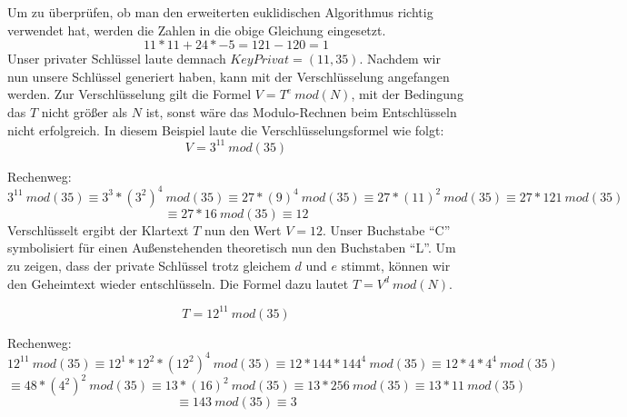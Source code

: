 Um zu überprüfen, ob man den erweiterten euklidischen Algorithmus richtig
verwendet hat, werden die Zahlen in die obige Gleichung eingesetzt.
\begin{displaymath}
11*11 + 24 * -5 = 121 - 120 = 1
\end{displaymath}
Unser privater Schlüssel laute demnach $KeyPrivat = (11,35)$.
\newline\newline
Nachdem wir nun unsere Schlüssel generiert haben, kann mit der Verschlüsselung
angefangen werden. Zur Verschlüsselung gilt die Formel $V = T^e \ mod(N)$, mit
der Bedingung das $T$ nicht größer als $N$ ist, sonst wäre das Modulo-Rechnen
beim Entschlüsseln nicht erfolgreich.
In diesem Beispiel laute die Verschlüsselungsformel wie folgt:
\begin{displaymath}
V = 3^{11} \ mod(35)
\end{displaymath}

Rechenweg:
\begin{displaymath}
3^{11} \ mod(35)
\equiv 3^3 *(3^2)^4 \ mod(35)
\equiv 27 * (9)^4 \ mod(35)
\equiv 27 * (11)^2 \ mod(35)
\equiv 27 * 121 \ mod(35)
\end{displaymath}
\begin{displaymath}
\equiv 27 * 16 \ mod(35)
\equiv 12
\end{displaymath}
\newline
Verschlüsselt ergibt der Klartext $T$ nun den Wert $V = 12$. Unser Buchstabe
"`C"' symbolisiert für einen Außenstehenden theoretisch nun den
Buchstaben "`L"'.
\newline\newline 
Um zu zeigen, dass der private Schlüssel trotz gleichem $d$ und $e$ stimmt,
können wir den Geheimtext wieder entschlüsseln.
Die Formel dazu lautet $T = V^d \ mod(N)$.

\begin{displaymath}
T = 12^{11} \ mod(35)
\end{displaymath}

Rechenweg:
\begin{displaymath}
12^{11} \ mod(35)
\equiv 12^1 * 12^2 * (12^2)^4 \ mod(35)
\equiv 12*144*144^4 \ mod(35)
\equiv 12*4*4^4 \ mod(35)
\end{displaymath}
\begin{displaymath}
\equiv 48*(4^2)^2 \ mod(35)
\equiv 13*(16)^2 \ mod(35)
\equiv 13*256 \ mod(35)
\equiv 13*11 \ mod(35)
\end{displaymath}
\begin{displaymath}
\equiv 143 \ mod(35)
\equiv 3
\end{displaymath}

